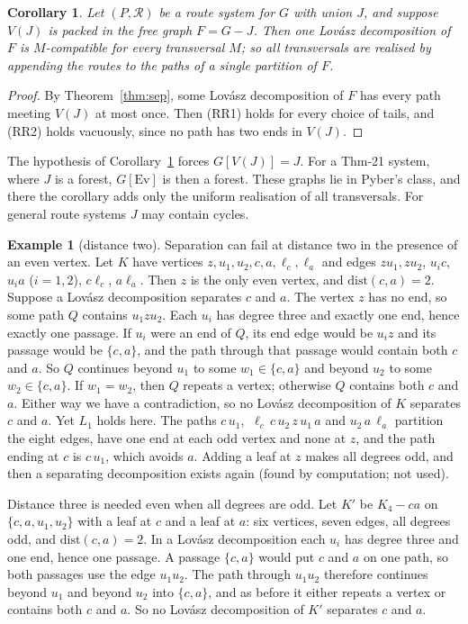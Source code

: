 \documentclass[11pt]{amsart}
\newtheorem{corollary}[theorem]{Corollary}
\theoremstyle{definition}
\newtheorem{example}[theorem]{Example}
\newcommand{\Ev}{\mathrm{Ev}}
\newcommand{\cR}{\mathcal R}
\begin{document}
\begin{corollary}\label{cor:packedroutes}
Let $(P,\cR)$ be a route system for $G$ with union $J$, and suppose $V(J)$ is packed in the free graph
$F=G-J$. Then one Lov\'asz decomposition of $F$ is $M$-compatible for every transversal $M$; so all
transversals are realised by appending the routes to the paths of a single partition of $F$.
\end{corollary}

\begin{proof}
By Theorem~\ref{thm:sep}, some Lov\'asz decomposition of $F$ has every path meeting $V(J)$ at most once.
Then (RR1) holds for every choice of tails, and (RR2) holds vacuously, since no path has two ends in
$V(J)$.
\end{proof}

The hypothesis of Corollary~\ref{cor:packedroutes} forces $G[V(J)]=J$. For a Thm-21 system, where $J$
is a forest, $G[\Ev]$ is then a forest. These graphs lie in Pyber's class, and there the corollary adds
only the uniform realisation of all transversals. For general route systems $J$ may contain cycles.

\begin{example}[distance two]\label{ex:dist2}
Separation can fail at distance two in the presence of an even vertex. Let $K$ have vertices
$z,u_1,u_2,c,a,\ell_c,\ell_a$ and edges $zu_1,zu_2$, $u_ic$, $u_ia$ ($i=1,2$), $c\ell_c$, $a\ell_a$.
Then $z$ is the only even vertex, and $\mathrm{dist}(c,a)=2$. Suppose a Lov\'asz decomposition
separates $c$ and $a$. The vertex $z$ has no end, so some path $Q$ contains $u_1zu_2$. Each $u_i$ has
degree three and exactly one end, hence exactly one passage. If $u_i$ were an end of $Q$, its end edge would
be $u_iz$ and its passage would be $\{c,a\}$, and the path through that passage would contain both $c$ and
$a$. So $Q$ continues beyond $u_1$ to some $w_1\in\{c,a\}$ and beyond $u_2$ to some $w_2\in\{c,a\}$.
If $w_1=w_2$, then $Q$ repeats a vertex; otherwise $Q$ contains both $c$ and $a$. Either way we have a
contradiction, so no Lov\'asz decomposition of $K$ separates $c$ and $a$. Yet $L_1$ holds here. The
paths $c\,u_1$, $\ \ell_c\,c\,u_2\,z\,u_1\,a$ and $u_2\,a\,\ell_a$ partition the eight edges, have one end
at each odd vertex and none at $z$, and the path ending at $c$ is $c\,u_1$, which avoids $a$. Adding a
leaf at $z$ makes all degrees odd, and then a separating decomposition exists again (found by computation;
not used).

Distance three is needed even when all degrees are odd. Let $K'$ be $K_4-ca$ on $\{c,a,u_1,u_2\}$ with a
leaf at $c$ and a leaf at $a$: six vertices, seven edges, all degrees odd, and $\mathrm{dist}(c,a)=2$. In
a Lov\'asz decomposition each $u_i$ has degree three and one end, hence one passage. A passage
$\{c,a\}$ would put $c$ and $a$ on one path, so both passages use the edge $u_1u_2$. The path through
$u_1u_2$ therefore continues beyond $u_1$ and beyond $u_2$ into $\{c,a\}$, and as before it either repeats
a vertex or contains both $c$ and $a$. So no Lov\'asz decomposition of $K'$ separates $c$ and $a$.
\end{example}
\end{document}
